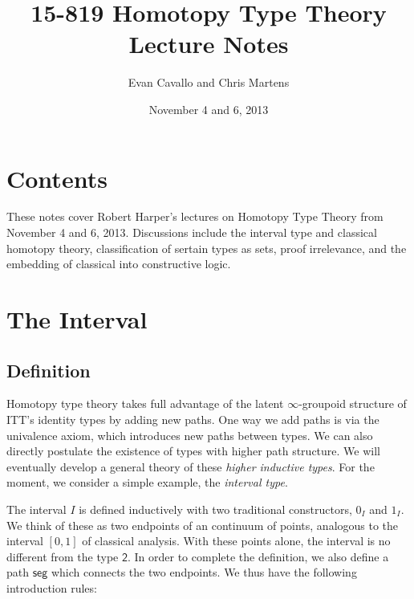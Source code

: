 \documentclass[11pt]{article}
\title{15-819 Homotopy Type Theory\\Lecture Notes}
\author{Evan Cavallo and Chris Martens}
\date{November 4 and 6, 2013}
\newcommand*{\Bool}{\mathsf{2}}
\newcommand*{\Interval}{I}
\newcommand*{\Izero}{0_I}
\newcommand*{\Ione}{1_I}
\newcommand*{\Iseg}{\mathsf{seg}}
\begin{document}
\maketitle

\section{Contents}

These notes cover Robert Harper's lectures on Homotopy Type Theory from
November 4 and 6, 2013. Discussions include the interval type and classical
homotopy theory, classification of sertain types as sets, 
proof irrelevance, and the embedding of classical into constructive logic.

% 
% 

\section{The Interval}

\subsection*{Definition}

Homotopy type theory takes full advantage of the latent $\infty$-groupoid structure of ITT's identity types by adding new paths. One way we add paths is via the univalence axiom, which introduces new paths between types. We can also directly postulate the existence of types with higher path structure. We will eventually develop a general theory of these \emph{higher inductive types}. For the moment, we consider a simple example, the \emph{interval type}.

\begin{center}
\end{center}

The interval $\Interval$ is defined inductively with two traditional constructors, $\Izero$ and $\Ione$. We think of these as two endpoints of an continuum of points, analogous to the interval $[0,1]$ of classical analysis. With these points alone, the interval is no different from the type $\Bool$. In order to complete the definition, we also define a path $\Iseg$ which connects the two endpoints. We thus have the following introduction rules:
\end{document}
